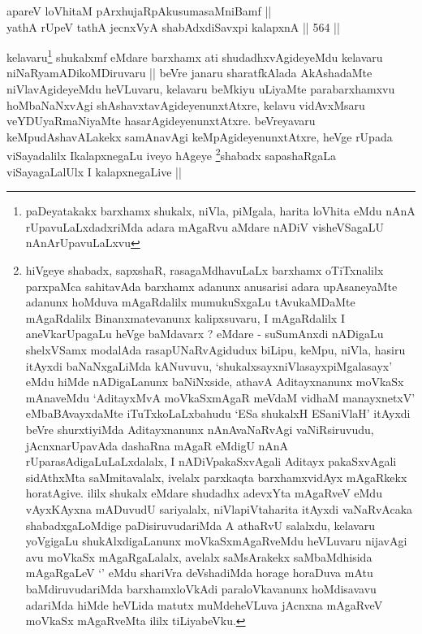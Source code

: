 \begin{shl}
apareV loVhitaM pArxhujaRpAkusumasaMniBamf || \\
yathA rUpeV tathA jecnxVyA shabAdxdiSavxpi kalapxnA ||  564 ||  
\end{shl}

\begin{artha}
kelavaru\footnote{paDeyatakakx barxhamx shukalx, niVla, piMgala,
  harita loVhita eMdu nAnA rUpavuLaLxdadxriMda adara mAgaRvu aMdare
  nADiV visheVSagaLU nAnArUpavuLaLxvu} shukalxmf eMdare barxhamx ati shudadhxvAgideyeMdu
kelavaru niNaRyamADikoMDiruvaru || beVre janaru sharatfkAlada
AkAshadaMte niVlavAgideyeMdu heVLuvaru, kelavaru beMkiyu uLiyaMte
parabarxhamxvu hoMbaNaNxvAgi shAshavxtavAgideyenunxtAtxre, kelavu
vidAvxMsaru veYDUyaRmaNiyaMte hasarAgideyenunxtAtxre. beVreyavaru
keMpudAshavALakekx samAnavAgi keMpAgideyenunxtAtxre, heVge rUpada
viSayadalilx IkalapxnegaLu iveyo hAgeye \footnote{hiVgeye shabadx,
  sapxshaR, rasagaMdhavuLaLx barxhamx oTiTxnalilx parxpaMca sahitavAda
  barxhamx adanunx anusarisi adara upAsaneyaMte adanunx hoMduva
  mAgaRdalilx mumukuSxgaLu tAvukaMDaMte mAgaRdalilx Binanxmatevanunx
  kalipxsuvaru, I mAgaRdalilx I aneVkarUpagaLu heVge baMdavarx ?
  eMdare - suSumAnxdi nADigaLu shelxVSamx modalAda rasapUNaRvAgidudux
  biLipu, keMpu, niVla, hasiru itAyxdi baNaNxgaLiMda kANuvuvu,
  `shukalxsayxniVlasayxpiMgalasayx' eMdu hiMde nADigaLanunx
  baNiNxside, athavA Aditayxnanunx moVkaSx mAnaveMdu `AditayxMvA
  moVkaSxmAgaR meVdaM vidhaM manayxnetxV' eMbaBAvayxdaMte
  iTuTxkoLaLxbahudu `ESa shukalxH ESaniVlaH' itAyxdi beVre
  shurxtiyiMda Aditayxnanunx nAnAvaNaRvAgi vaNiRsiruvudu,
  jAcnxnarUpavAda dashaRna mAgaR eMdigU nAnA rUparasAdigaLuLaLxdalalx,
  I nADiVpakaSxvAgali Aditayx pakaSxvAgali sidAthxMta saMmitavalalx,
  ivelalx parxkaqta barxhamxvidAyx mAgaRkekx horatAgive. ililx shukalx
  eMdare shudadhx adevxYta mAgaRveV eMdu vAyxKAyxna mADuvudU
  sariyalalx, niVlapiVtaharita itAyxdi vaNaRvAcaka shabadxgaLoMdige
  paDisiruvudariMda A athaRvU salalxdu, kelavaru yoVgigaLu
  shukAlxdigaLanunx moVkaSxmAgaRveMdu heVLuvaru nijavAgi avu moVkaSx
  mAgaRgaLalalx, avelalx saMsArakekx saMbaMdhisida mAgaRgaLeV `\stext'
  eMdu shariVra deVshadiMda horage horaDuva mAtu baMdiruvudariMda
  barxhamxloVkAdi paraloVkavanunx hoMdisavavu adariMda hiMde heVLida
  matutx muMdeheVLuva jAcnxna mAgaRveV moVkaSx mAgaRveMta ililx tiLiyabeVku.}shabadx
sapashaRgaLa viSayagaLalUlx I kalapxnegaLive ||
\end{artha}


